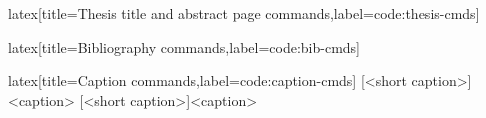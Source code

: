 \begin{code}[firstnumber=last]{latex}[title={Thesis title and abstract page commands},label=code:thesis-cmds]
\maketitle[thesis]
\end{code}
%
\begin{code}[firstnumber=last]{latex}[title={Bibliography commands},label=code:bib-cmds]
\makebibliography[<options>]
\end{code}
%
\begin{code}[firstnumber=last]{latex}[title={Caption commands},label=code:caption-cmds]
[<short caption>]{<caption>}
[<short caption>]{<caption>}
\end{code}
%

